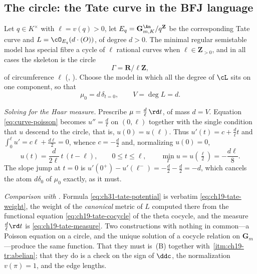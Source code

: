 \subsection{The circle: the Tate curve in the BFJ language}
\label{sec:ch31-circle}

\begin{example}
\label{ex:ch31-tate-bfj}
Let $q\in K^\times$ with $\ell=v(q)>0$, let
$E_q=\mathbf G_{m,K}^{\An}/q^{\mathbf Z}$ be the corresponding Tate curve
and $L=\cO_{E_q}(d\cdot(O))$, of degree $d>0$.  The minimal regular
semistable model has special fibre a cycle of $\ell$ rational curves when
$\ell\in\mathbf Z_{>0}$, and in all cases the skeleton is the circle
\[
 \Gamma=\mathbf R/\ell\mathbf Z ,
\]
of circumference $\ell$ (,
).  Choose the model in which all the degree of
$\cL$ sits on one component, so that
\[
 \mu_0=d\,\delta_{t=0},\qquad V=\deg L=d .
\]

\emph{Solving for the Haar measure.}  Prescribe
$\mu=\tfrac d\ell\,\rd t$, of mass $d=V$.  Equation
\eqref{eq:curve-poisson} becomes $u''=\tfrac d\ell$ on $(0,\ell)$
together with the single condition that $u$ descend to the circle, that
is, $u(0)=u(\ell)$.  Thus $u'(t)=c+\tfrac d\ell t$ and
$\int_0^\ell u'=c\ell+\tfrac{d\ell}{2}=0$, whence $c=-\tfrac d2$ and,
normalizing $u(0)=0$,
\begin{equation}
\label{eq:ch31-tate-potential}
 u(t)=\frac{d}{2\ell}\,t\,(t-\ell),
 \qquad 0\leq t\leq\ell,
 \qquad \min_\Gamma u=u(\tfrac\ell2)=-\frac{d\ell}{8} .
\end{equation}
The slope jump at $t=0$ is
$u'(0^+)-u'(\ell^-)=-\tfrac d2-\tfrac d2=-d$, which cancels the atom
$d\delta_0$ of $\mu_0$ exactly, as it must.

\emph{Comparison with .}  Formula
\eqref{eq:ch31-tate-potential} is verbatim \eqref{eq:ch19-tate-weight}, the
weight of the \emph{canonical} metric of $L$ computed there from the
functional equation \eqref{eq:ch19-tate-cocycle} of the theta cocycle, and
the measure $\tfrac d\ell\rd t$ is \eqref{eq:ch19-tate-measure}.  Two
constructions with nothing in common---a Poisson equation on a circle, and
the unique solution of a cocycle relation on $\mathbf G_m$---produce the
same function.  That they must is
\,(B) together with
\,\cref{itm:ch19-tr:abelian}; that they do is a
check on the sign of $\ddc$, the normalization $v(\pi)=1$, and the edge
lengths.


\end{example}
